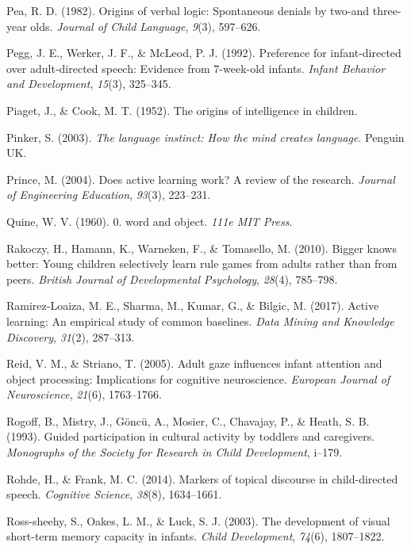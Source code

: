 \documentclass[oneside]{report}
\begin{document}
\hypertarget{ref-pea1982origins}{}
Pea, R. D. (1982). Origins of verbal logic: Spontaneous denials by
two-and three-year olds. \emph{Journal of Child Language}, \emph{9}(3),
597--626.

\hypertarget{ref-pegg1992preference}{}
Pegg, J. E., Werker, J. F., \& McLeod, P. J. (1992). Preference for
infant-directed over adult-directed speech: Evidence from 7-week-old
infants. \emph{Infant Behavior and Development}, \emph{15}(3), 325--345.

\hypertarget{ref-piaget1952origins}{}
Piaget, J., \& Cook, M. T. (1952). The origins of intelligence in
children.

\hypertarget{ref-pinker2003language}{}
Pinker, S. (2003). \emph{The language instinct: How the mind creates
language}. Penguin UK.

\hypertarget{ref-prince2004does}{}
Prince, M. (2004). Does active learning work? A review of the research.
\emph{Journal of Engineering Education}, \emph{93}(3), 223--231.

\hypertarget{ref-quine19600}{}
Quine, W. V. (1960). 0. word and object. \emph{111e MIT Press}.

\hypertarget{ref-rakoczy2010bigger}{}
Rakoczy, H., Hamann, K., Warneken, F., \& Tomasello, M. (2010). Bigger
knows better: Young children selectively learn rule games from adults
rather than from peers. \emph{British Journal of Developmental
Psychology}, \emph{28}(4), 785--798.

\hypertarget{ref-ramirez2017active}{}
Ramirez-Loaiza, M. E., Sharma, M., Kumar, G., \& Bilgic, M. (2017).
Active learning: An empirical study of common baselines. \emph{Data
Mining and Knowledge Discovery}, \emph{31}(2), 287--313.

\hypertarget{ref-reid2005adult}{}
Reid, V. M., \& Striano, T. (2005). Adult gaze influences infant
attention and object processing: Implications for cognitive
neuroscience. \emph{European Journal of Neuroscience}, \emph{21}(6),
1763--1766.

\hypertarget{ref-rogoff1993guided}{}
Rogoff, B., Mistry, J., Göncü, A., Mosier, C., Chavajay, P., \& Heath,
S. B. (1993). Guided participation in cultural activity by toddlers and
caregivers. \emph{Monographs of the Society for Research in Child
Development}, i--179.

\hypertarget{ref-rohde2014markers}{}
Rohde, H., \& Frank, M. C. (2014). Markers of topical discourse in
child-directed speech. \emph{Cognitive Science}, \emph{38}(8),
1634--1661.

\hypertarget{ref-ross2003development}{}
Ross-sheehy, S., Oakes, L. M., \& Luck, S. J. (2003). The development of
visual short-term memory capacity in infants. \emph{Child Development},
\emph{74}(6), 1807--1822.
\end{document}
